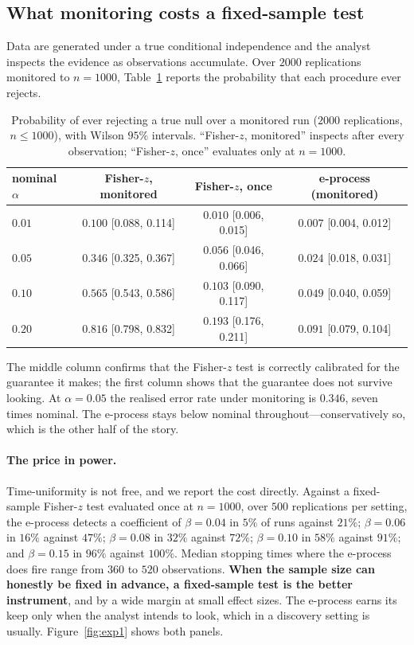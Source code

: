 \subsection{What monitoring costs a fixed-sample test}
\label{sec:exp-calibration}

Data are generated under a true conditional independence and the analyst
inspects the evidence as observations accumulate. Over $2000$ replications
monitored to $n = 1000$, Table~\ref{tab:calibration} reports the probability
that each procedure ever rejects.

\begin{table}[t]
\centering
\caption{Probability of ever rejecting a true null over a monitored run
($2000$ replications, $n \le 1000$), with Wilson $95\%$ intervals.
``Fisher-$z$, monitored'' inspects after every observation; ``Fisher-$z$,
once'' evaluates only at $n = 1000$.}\label{tab:calibration}
\begin{tabular}{@{}lccc@{}}
\toprule
nominal $\alpha$ & Fisher-$z$, monitored & Fisher-$z$, once &
e-process (monitored) \\
\midrule
$0.01$ & $0.100$ \small{[0.088, 0.114]} & $0.010$ \small{[0.006, 0.015]} &
         $0.007$ \small{[0.004, 0.012]} \\
$0.05$ & $0.346$ \small{[0.325, 0.367]} & $0.056$ \small{[0.046, 0.066]} &
         $0.024$ \small{[0.018, 0.031]} \\
$0.10$ & $0.565$ \small{[0.543, 0.586]} & $0.103$ \small{[0.090, 0.117]} &
         $0.049$ \small{[0.040, 0.059]} \\
$0.20$ & $0.816$ \small{[0.798, 0.832]} & $0.193$ \small{[0.176, 0.211]} &
         $0.091$ \small{[0.079, 0.104]} \\
\bottomrule
\end{tabular}
\end{table}

The middle column confirms that the Fisher-$z$ test is correctly calibrated
for the guarantee it makes; the first column shows that the guarantee does not
survive looking. At $\alpha = 0.05$ the realised error rate under monitoring
is $0.346$, seven times nominal. The e-process stays below nominal
throughout---conservatively so, which is the other half of the story.

\paragraph{The price in power.} Time-uniformity is not free, and we
report the cost directly. Against a fixed-sample Fisher-$z$ test evaluated
once at $n = 1000$, over $500$ replications per setting, the e-process detects
a coefficient of $\beta = 0.04$ in $5\%$ of runs against $21\%$; $\beta =
0.06$ in $16\%$ against $47\%$; $\beta = 0.08$ in $32\%$ against $72\%$;
$\beta = 0.10$ in $58\%$ against $91\%$; and $\beta = 0.15$ in $96\%$ against
$100\%$. Median stopping times where the e-process does fire range from $360$
to $520$ observations. \textbf{When the sample size can honestly be fixed in
advance, a fixed-sample test is the better instrument}, and by a wide margin
at small effect sizes. The e-process earns its keep only when the analyst
intends to look, which in a discovery setting is usually.
Figure~\ref{fig:exp1} shows both panels.

